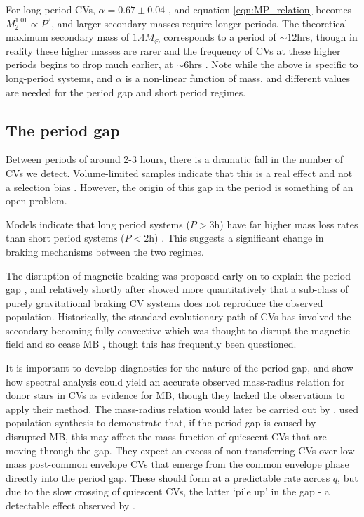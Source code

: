 For long-period CVs, $\alpha = 0.67\pm0.04$ \citep{knigge11}, and equation \ref{eqn:MP_relation} becomes $M_2^{1.01} \propto P^{2}$, and larger secondary masses require longer periods. The theoretical maximum secondary mass of $1.4 M_{\odot}$ corresponds to a period of $\sim12$hrs, though in reality these higher masses are rarer and the frequency of CVs at these higher periods begins to drop much earlier, at $\sim6$hrs \citep{gaensicke2009}. Note while the above is specific to long-period systems, and $\alpha$ is a non-linear function of mass, and different values are needed for the period gap and short period regimes.


\subsection{The period gap}
\label{sect:introduction:period gap}

Between periods of around 2-3 hours, there is a dramatic fall in the number of CVs we detect. Volume-limited samples indicate that this is a real effect and not a selection bias \citep{Kolb1998}. However, the origin of this gap in the period is something of an open problem.

Models indicate that long period systems ($P > 3$h) have far higher mass loss rates than short period systems ($P < 2$h) \citep{ritter1985}. This suggests a significant change in braking mechanisms between the two regimes. 

The disruption of magnetic braking was proposed early on to explain the period gap \citep{rappaport1983, spruit1983}, and relatively shortly after \citet{kolb1993} showed more quantitatively that a sub-class of purely gravitational braking CV systems does not reproduce the observed population. Historically, the standard evolutionary path of CVs has involved the secondary becoming fully convective which was thought to disrupt the magnetic field and so cease MB \citep{knigge11}, though this has frequently been questioned. 

It is important to develop diagnostics for the nature of the period gap, and \citet{smith1998} show how spectral analysis could yield an accurate observed mass-radius relation for donor stars in CVs as evidence for MB, though they lacked the observations to apply their method. The mass-radius relation would later be carried out by \citet{knigge11}.
\citet{Davis2008} used population synthesis to demonstrate that, if the period gap is caused by disrupted MB, this may affect the mass function of quiescent CVs that are moving through the gap. They expect an excess of non-transferring CVs over low mass post-common envelope CVs that emerge from the common envelope phase directly into the period gap. These should form at a predictable rate across $q$, but due to the slow crossing of quiescent CVs, the latter `pile up' in the gap - a detectable effect observed by \citet{zorotovic2011}.

